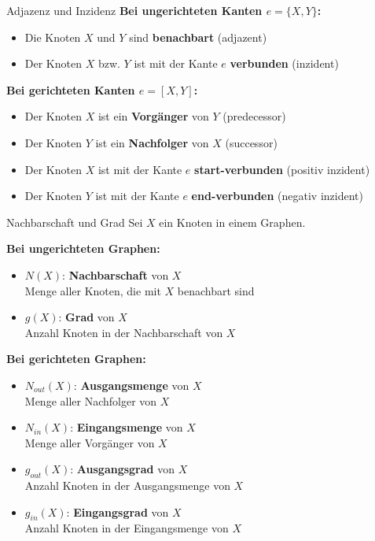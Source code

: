 \documentclass[a4paper, fontsize=7pt]{scrartcl}
\begin{document}
\begin{mainbox}{Adjazenz und Inzidenz}
\textbf{Bei ungerichteten Kanten $e = \{X, Y\}$:}
\begin{itemize}
    \item Die Knoten $X$ und $Y$ sind \textbf{benachbart} (adjazent)
    \item Der Knoten $X$ bzw. $Y$ ist mit der Kante $e$ \textbf{verbunden} (inzident)
\end{itemize}

\textbf{Bei gerichteten Kanten $e = [X, Y]$:}
\begin{itemize}
    \item Der Knoten $X$ ist ein \textbf{Vorg\"anger} von $Y$ (predecessor)
    \item Der Knoten $Y$ ist ein \textbf{Nachfolger} von $X$ (successor)
    \item Der Knoten $X$ ist mit der Kante $e$ \textbf{start-verbunden} (positiv inzident)
    \item Der Knoten $Y$ ist mit der Kante $e$ \textbf{end-verbunden} (negativ inzident)
\end{itemize}
\end{mainbox}

\begin{mainbox}{Nachbarschaft und Grad}
Sei $X$ ein Knoten in einem Graphen.

\textbf{Bei ungerichteten Graphen:}
\begin{itemize}
    \item $N(X)$: \textbf{Nachbarschaft} von $X$\\
          Menge aller Knoten, die mit $X$ benachbart sind
    \item $g(X)$: \textbf{Grad} von $X$\\
          Anzahl Knoten in der Nachbarschaft von $X$
\end{itemize}

\textbf{Bei gerichteten Graphen:}
\begin{itemize}
    \item $N_{out}(X)$: \textbf{Ausgangsmenge} von $X$\\
          Menge aller Nachfolger von $X$
    \item $N_{in}(X)$: \textbf{Eingangsmenge} von $X$\\
          Menge aller Vorg\"anger von $X$
    \item $g_{out}(X)$: \textbf{Ausgangsgrad} von $X$\\
          Anzahl Knoten in der Ausgangsmenge von $X$
    \item $g_{in}(X)$: \textbf{Eingangsgrad} von $X$\\
          Anzahl Knoten in der Eingangsmenge von $X$
\end{itemize}
\end{mainbox}
\end{document}
